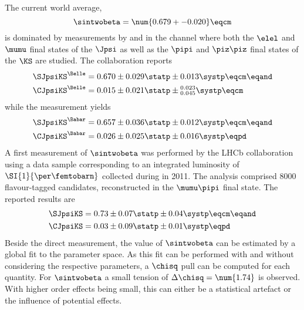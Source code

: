 The current world average, \cite{Amhis:2014hma}
%
\begin{equation*}
  \sintwobeta = \num{0.679 +- 0.020} \eqcm
\end{equation*}
%
is dominated by measurements by \Babar and \Belle in the \BdToJpsiKS channel
where both the $\elel$ and $\mumu$ final states of the $\Jpsi$ as well as the
$\pipi$ and $\piz\piz$ final states of the $\KS$ are studied. The \Belle
collaboration \cite{Adachi:2012et} reports
%
\begin{equation*}
  \begin{split}
    \SJpsiKS^{\text{\Belle}} &= 0.670 \pm 0.029 \statp \pm 0.013 \systp              \eqcm\eqand \\
    \CJpsiKS^{\text{\Belle}} &= 0.015 \pm 0.021 \statp \pm {}_{0.045}^{0.023} \systp \eqcm
  \end{split}
\end{equation*}
%
while the \Babar measurement \cite{Aubert:2009aw} yields
%
\begin{equation*}
  \begin{split}
    \SJpsiKS^{\text{\Babar}} &= 0.657 \pm 0.036 \statp \pm 0.012 \systp \eqcm\eqand \\
    \CJpsiKS^{\text{\Babar}} &= 0.026 \pm 0.025 \statp \pm 0.016 \systp \eqpd
  \end{split}
\end{equation*}
%
A first measurement of $\sintwobeta$ was performed by the \acs*{LHCb}
collaboration using a data sample corresponding to an integrated luminosity of
$\SI{1}{\per\femtobarn}$ collected during \RunOne in 2011. The analysis
comprised $\num{8000}$ flavour-tagged \BdToJpsiKS candidates, reconstructed in
the $\mumu\pipi$ final state. The reported results \cite{Aaij:1497268} are
%
\begin{equation*}
  \begin{split}
    \SJpsiKS &= 0.73 \pm 0.07 \statp \pm 0.04 \systp \eqcm\eqand \\
    \CJpsiKS &= 0.03 \pm 0.09 \statp \pm 0.01 \systp \eqpd
  \end{split}
\end{equation*}
%
Beside the direct measurement, the value of $\sintwobeta$ can be estimated by a
global fit to the \CKM parameter space. As this fit can be performed with and
without considering the respective parameters, a $\chisq$ pull can be computed
for each quantity. For $\sintwobeta$ a small tension of $\Delta\chisq =
\num{1.74}$ is observed. With higher order effects being small, this can either
be a statistical artefact or the influence of potential \BSM effects.
